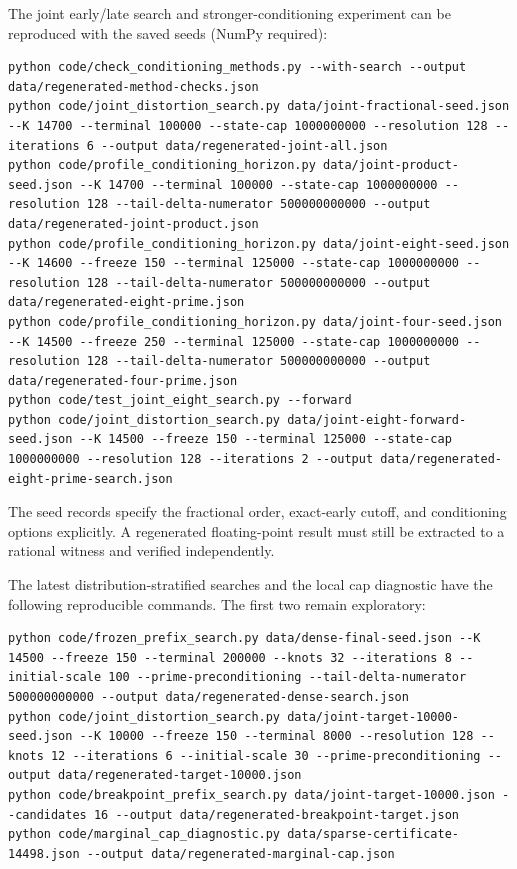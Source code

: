 \documentclass[11pt]{article}
\begin{document}
The joint early/late search and stronger-conditioning experiment can be
reproduced with the saved seeds (NumPy required):
\begin{lstlisting}[basicstyle=\ttfamily\small,breaklines=true]
python code/check_conditioning_methods.py --with-search --output data/regenerated-method-checks.json
python code/joint_distortion_search.py data/joint-fractional-seed.json --K 14700 --terminal 100000 --state-cap 1000000000 --resolution 128 --iterations 6 --output data/regenerated-joint-all.json
python code/profile_conditioning_horizon.py data/joint-product-seed.json --K 14700 --terminal 100000 --state-cap 1000000000 --resolution 128 --tail-delta-numerator 500000000000 --output data/regenerated-joint-product.json
python code/profile_conditioning_horizon.py data/joint-eight-seed.json --K 14600 --freeze 150 --terminal 125000 --state-cap 1000000000 --resolution 128 --tail-delta-numerator 500000000000 --output data/regenerated-eight-prime.json
python code/profile_conditioning_horizon.py data/joint-four-seed.json --K 14500 --freeze 250 --terminal 125000 --state-cap 1000000000 --resolution 128 --tail-delta-numerator 500000000000 --output data/regenerated-four-prime.json
python code/test_joint_eight_search.py --forward
python code/joint_distortion_search.py data/joint-eight-forward-seed.json --K 14500 --freeze 150 --terminal 125000 --state-cap 1000000000 --resolution 128 --iterations 2 --output data/regenerated-eight-prime-search.json
\end{lstlisting}
The seed records specify the fractional order, exact-early cutoff, and
conditioning options explicitly. A regenerated floating-point result must
still be extracted to a rational witness and verified independently.

The latest distribution-stratified searches and the local cap diagnostic
have the following reproducible commands. The first two remain exploratory:
\begin{lstlisting}[basicstyle=\ttfamily\small,breaklines=true]
python code/frozen_prefix_search.py data/dense-final-seed.json --K 14500 --freeze 150 --terminal 200000 --knots 32 --iterations 8 --initial-scale 100 --prime-preconditioning --tail-delta-numerator 500000000000 --output data/regenerated-dense-search.json
python code/joint_distortion_search.py data/joint-target-10000-seed.json --K 10000 --freeze 150 --terminal 8000 --resolution 128 --knots 12 --iterations 6 --initial-scale 30 --prime-preconditioning --output data/regenerated-target-10000.json
python code/breakpoint_prefix_search.py data/joint-target-10000.json --candidates 16 --output data/regenerated-breakpoint-target.json
python code/marginal_cap_diagnostic.py data/sparse-certificate-14498.json --output data/regenerated-marginal-cap.json
\end{lstlisting}
\end{document}
